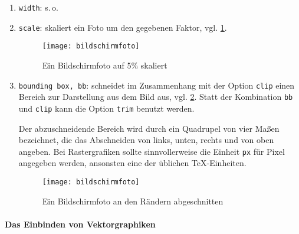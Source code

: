 \documentclass[ngerman,               %
               a4paper,               %
               fleqn,                 %
                     ]{scrartcl}       %
\begin{document}
\begin{enumerate}
  \item \texttt{width}: s.\,o.
  \item \texttt{scale}: skaliert ein Foto um den gegebenen Faktor,
    vgl. \cref{fig:bildschirm_05}.
    \begin{figure}[htb]
        \centering%
        \texttt{[image: bildschirmfoto]}
        \caption{Ein Bildschirmfoto auf 5\% skaliert} %
        \label{fig:bildschirm_05}
    \end{figure}

  \item \texttt{bounding box, bb}: schneidet im Zusammenhang mit der Option
    \texttt{clip} einen Bereich zur Darstellung aus dem Bild aus,
    vgl. \cref{fig:bildschirm_bb}. Statt der Kombination \texttt{bb} und
    \texttt{clip} kann die Option \texttt{trim} benutzt werden.

    Der abzuschneidende Bereich wird durch ein Quadrupel von vier Maßen
    bezeichnet, die das Abschneiden von links, unten, rechts und von oben
    angeben.  Bei Rastergrafiken sollte sinnvollerweise die Einheit
    \texttt{px} für Pixel angegeben werden, ansonsten eine der üblichen
    \TeX-Einheiten.
    \begin{figure}[htb]
        \centering%
        \texttt{[image: bildschirmfoto]}
        \caption{Ein Bildschirmfoto an den Rändern abgeschnitten} %
        \label{fig:bildschirm_bb}
    \end{figure}
\end{enumerate}


\paragraph{Das Einbinden von Vektorgraphiken}
\end{document}
